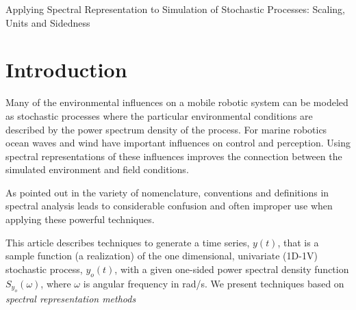 \documentclass[11pt]{article}
\newcommand{\doctitle}{Applying Spectral Representation to Simulation of Stochastic Processes: Scaling, Units and Sidedness}
\begin{document}
\setlength{\IEEEnormaljot}{10pt}%


\newcommand{\SF}{0.7}
\newcommand{\SFb}{0.45}
\newcommand{\SFPic}{0.45}
\newcommand{\SFPlot}{0.45}
\newcommand{\SFc}{0.52}
\newcommand{\FigWidth}{\SF}


\newpage
\setcounter{page}{1}
\begin{center}
{\huge \doctitle}
\end{center}

\begin{abstract}
	Simulating sample functions of a stochastic process defined by a power spectral density is theoretically well defined and a variety of methods are available, most common are the summation of cosines and fast Fourier transform (FFT) approaches.  Applying the mathematical theory to physical phenomena depends crucially on the conventions used in the mathematical definitions, normalization and scaling and appropriate use of one and two-sided spectra.  This report synthesizes the basic mathematical background, presented with the intent of providing a self-consistent set of conventions for the practitioner.  We also present a complete example in MATLAB to demonstrate the important details of considering scaling, units and sidedness.
\end{abstract}


\section{Introduction}
Many of the environmental influences on a mobile robotic system can be modeled as stochastic processes where the particular environmental conditions are described by the power spectrum density of the process.  For marine robotics ocean waves and wind have important influences on control and perception.  Using spectral representations of these influences improves the connection between the simulated environment and field conditions.


As pointed out in \cite{barbour15normalization} the variety of nomenclature, conventions and definitions in spectral analysis leads to considerable confusion and often improper use when applying these powerful techniques.

This article describes techniques to generate a time series, $y(t)$, that is a sample function (a realization) of the one dimensional, univariate (1D-1V) stochastic process, $y_o(t)$, with a given one-sided power spectral density function $S_{y_{o}}(\omega)$, where $\omega$ is angular frequency in \unit[]{rad/s}.  We present techniques based on \emph{spectral representation methods} 
\end{document}

